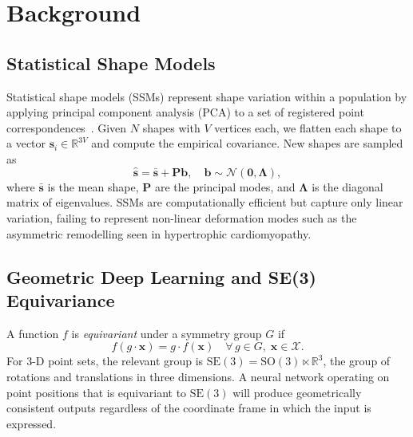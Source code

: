 \documentclass{article}
\newcommand{\R}{\mathbb{R}}
\newcommand{\SE}{\mathrm{SE}(3)}
\newcommand{\SO}{\mathrm{SO}(3)}
\begin{document}
\section{Background}
\label{sec:background}

\subsection{Statistical Shape Models}
\label{sec:bg_ssm}

Statistical shape models (SSMs) represent shape variation within a
population by applying principal component analysis (PCA) to a set of
registered point correspondences~\cite{cootes1995active}.
Given $N$ shapes with $V$ vertices each, we flatten each shape to a
vector $\mathbf{s}_i \in \R^{3V}$ and compute the empirical covariance.
New shapes are sampled as
\begin{equation}
    \hat{\mathbf{s}} = \bar{\mathbf{s}} + \mathbf{P}\mathbf{b},
    \quad \mathbf{b} \sim \mathcal{N}(\mathbf{0}, \boldsymbol{\Lambda}),
\end{equation}
where $\bar{\mathbf{s}}$ is the mean shape, $\mathbf{P}$ are the
principal modes, and $\boldsymbol{\Lambda}$ is the diagonal matrix of
eigenvalues.
SSMs are computationally efficient but capture only linear variation,
failing to represent non-linear deformation modes such as the asymmetric
remodelling seen in hypertrophic cardiomyopathy.

\subsection{Geometric Deep Learning and SE(3) Equivariance}
\label{sec:bg_geo}

A function $f$ is \emph{equivariant} under a symmetry group $G$ if
\begin{equation}
    f(g \cdot \mathbf{x}) = g \cdot f(\mathbf{x})
    \quad \forall\, g \in G,\; \mathbf{x} \in \mathcal{X}.
\end{equation}
For 3-D point sets, the relevant group is $\SE = \SO \ltimes \R^3$,
the group of rotations and translations in three dimensions.
A neural network operating on point positions that is equivariant to
$\SE$ will produce geometrically consistent outputs regardless of the
coordinate frame in which the input is expressed.
\end{document}
